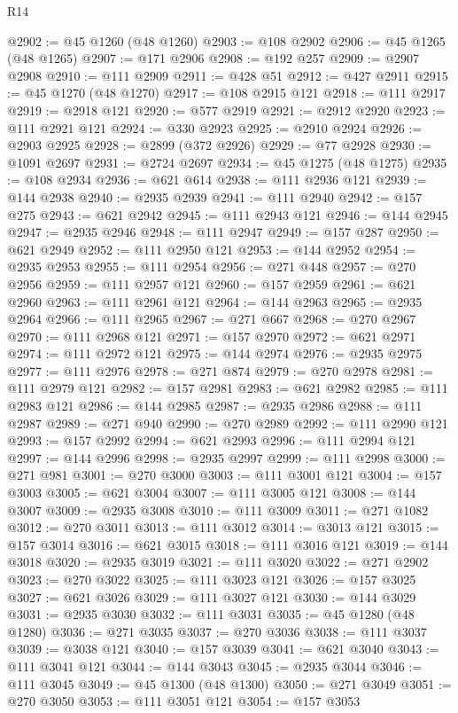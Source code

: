 \begin{lexlean}{R14}
\begin{coremodule}
@2902 := @45 @1260 (@48 @1260)
@2903 := @108 @2902
@2906 := @45 @1265 (@48 @1265)
@2907 := @171 @2906
@2908 := @192 @257
@2909 := @2907 @2908
@2910 := @111 @2909
@2911 := @428 @51
@2912 := @427 @2911
@2915 := @45 @1270 (@48 @1270)
@2917 := @108 @2915 @121
@2918 := @111 @2917
@2919 := @2918 @121
@2920 := @577 @2919
@2921 := @2912 @2920
@2923 := @111 @2921 @121
@2924 := @330 @2923
@2925 := @2910 @2924
@2926 := @2903 @2925
@2928 := @2899 (@372 @2926)
@2929 := @77 @2928
@2930 := @1091 @2697
@2931 := @2724 @2697
@2934 := @45 @1275 (@48 @1275)
@2935 := @108 @2934
@2936 := @621 @614
@2938 := @111 @2936 @121
@2939 := @144 @2938
@2940 := @2935 @2939
@2941 := @111 @2940
@2942 := @157 @275
@2943 := @621 @2942
@2945 := @111 @2943 @121
@2946 := @144 @2945
@2947 := @2935 @2946
@2948 := @111 @2947
@2949 := @157 @287
@2950 := @621 @2949
@2952 := @111 @2950 @121
@2953 := @144 @2952
@2954 := @2935 @2953
@2955 := @111 @2954
@2956 := @271 @448
@2957 := @270 @2956
@2959 := @111 @2957 @121
@2960 := @157 @2959
@2961 := @621 @2960
@2963 := @111 @2961 @121
@2964 := @144 @2963
@2965 := @2935 @2964
@2966 := @111 @2965
@2967 := @271 @667
@2968 := @270 @2967
@2970 := @111 @2968 @121
@2971 := @157 @2970
@2972 := @621 @2971
@2974 := @111 @2972 @121
@2975 := @144 @2974
@2976 := @2935 @2975
@2977 := @111 @2976
@2978 := @271 @874
@2979 := @270 @2978
@2981 := @111 @2979 @121
@2982 := @157 @2981
@2983 := @621 @2982
@2985 := @111 @2983 @121
@2986 := @144 @2985
@2987 := @2935 @2986
@2988 := @111 @2987
@2989 := @271 @940
@2990 := @270 @2989
@2992 := @111 @2990 @121
@2993 := @157 @2992
@2994 := @621 @2993
@2996 := @111 @2994 @121
@2997 := @144 @2996
@2998 := @2935 @2997
@2999 := @111 @2998
@3000 := @271 @981
@3001 := @270 @3000
@3003 := @111 @3001 @121
@3004 := @157 @3003
@3005 := @621 @3004
@3007 := @111 @3005 @121
@3008 := @144 @3007
@3009 := @2935 @3008
@3010 := @111 @3009
@3011 := @271 @1082
@3012 := @270 @3011
@3013 := @111 @3012
@3014 := @3013 @121
@3015 := @157 @3014
@3016 := @621 @3015
@3018 := @111 @3016 @121
@3019 := @144 @3018
@3020 := @2935 @3019
@3021 := @111 @3020
@3022 := @271 @2902
@3023 := @270 @3022
@3025 := @111 @3023 @121
@3026 := @157 @3025
@3027 := @621 @3026
@3029 := @111 @3027 @121
@3030 := @144 @3029
@3031 := @2935 @3030
@3032 := @111 @3031
@3035 := @45 @1280 (@48 @1280)
@3036 := @271 @3035
@3037 := @270 @3036
@3038 := @111 @3037
@3039 := @3038 @121
@3040 := @157 @3039
@3041 := @621 @3040
@3043 := @111 @3041 @121
@3044 := @144 @3043
@3045 := @2935 @3044
@3046 := @111 @3045
@3049 := @45 @1300 (@48 @1300)
@3050 := @271 @3049
@3051 := @270 @3050
@3053 := @111 @3051 @121
@3054 := @157 @3053

\end{coremodule}
\end{lexlean}
